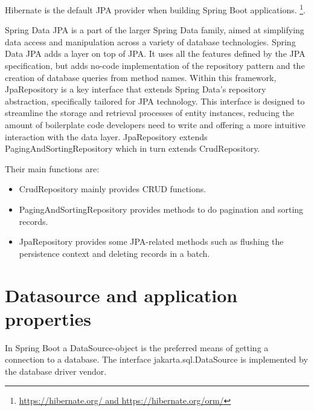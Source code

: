 
Hibernate is the default JPA provider when building Spring Boot applications. \footnote{\url{https://hibernate.org/ and https://hibernate.org/orm/}}.  

Spring Data JPA is a part of the larger Spring Data family, aimed at simplifying data access and manipulation across a variety of database technologies.
Spring Data JPA adds a layer on top of JPA. It uses all the features defined by the JPA specification, but adds no-code implementation of the repository pattern and the creation of database queries from method names.
Within this framework, JpaRepository is a key interface that extends Spring Data’s repository abstraction, specifically tailored for JPA technology. This interface is designed to streamline the storage and retrieval processes of entity instances, reducing the amount of boilerplate code developers need to write and offering a more intuitive interaction with the data layer.
JpaRepository extends PagingAndSortingRepository which in turn extends CrudRepository.

Their main functions are:

\begin{itemize}
\item CrudRepository mainly provides CRUD functions.
\item PagingAndSortingRepository provides methods to do pagination and sorting records.
\item JpaRepository provides some JPA-related methods such as flushing the persistence context and deleting records in a batch.
\end{itemize}


\section{Datasource and application properties}

In Spring Boot a DataSource-object is the preferred means of getting a connection to a database.
The interface jakarta.sql.DataSource is implemented by the database driver vendor. 

